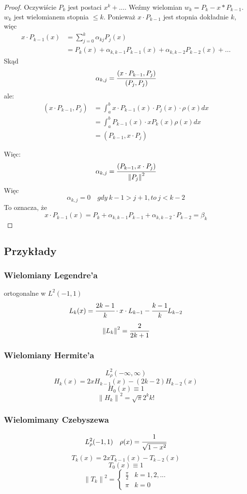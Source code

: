 \documentclass[hidelinks,a4paper,fleqn,oneside]{book}
\newcommand{\norm}[1]{\left\lVert#1\right\rVert}
\begin{document}
\begin{proof} Oczywiście $P_k$ jest postaci $x^k + ...$. Weźmy wielomian $w_k = P_k - x * P_{k-1}$. $w_k$ jest wielomianem stopnia $\leq k$. Ponieważ $x \cdot P_{k-1}$ jest stopnia dokładnie $k$, więc 
\[
	\begin{array}{cc}
	x \cdot P_{k-1}(x) & = \sum_{j=0}^k \alpha_{kj} P_j(x) \\
		& = P_k(x) + \alpha_{k, k-1} P_{k-1}(x) + \alpha_{k, k-2}P_{k-2}(x) + ...
	\end{array}
\]
Skąd
\[
	\alpha_{k, j} = \cfrac{(x \cdot P_{k-1}, P_j)}{(P_j, P_j)}
\]
ale:
\[
	\begin{array}{cc}
		(x \cdot P_{k-1}, P_j) & = \int_a^b x \cdot P_{k-1}(x) \cdot P_j(x) \cdot \rho(x) dx \\
		& = \int_a^b P_{k-1}(x) \cdot x P_k(x) \rho (x) dx  \\
		& = (P_{k-1}, x\cdot P_j)
	\end{array}
\]

Więc:
\[
	\alpha_{k, j} = \cfrac{(P_{k-1}, x \cdot P_j)}{\norm{P_j}^2}
\]
Więc
\[
	\alpha_{k, j} = 0 \quad gdy\ k-1 >j+1, to\ j < k-2
\]
To oznacza, że
\[
	x \cdot P_{k-1}(x) = P_k + \alpha_{k, k-1} P_{k-1} + \alpha_{k, k-2} \cdot P_{k-2} = \beta_k
\]

\end{proof}

\subsection{Przykłady}

\subsubsection{Wielomiany Legendre'a}

ortogonalne w $L^2(-1, 1)$
\[
	L_k(x) = \cfrac{2k-1}{k} \cdot x \cdot L_{k-1} - \cfrac{k-1}{k}L_{k-2}
\]
\[
	\norm{L_k}^2 = \cfrac{2}{2k+1}
\]

\subsubsection{Wielomiany Hermite'a}
\[
L_\rho^2(-\infty, \infty)
\]
\[
H_k(x) = 2xH_{k-1}(x) - (2k - 2)H_{k-2}(x)
\]
\[
	H_0(x) \equiv 1
\]
\[
	\norm{H_k}^2 = \sqrt{\pi} 2^k k!
\]
\subsubsection{Wielomimany Czebyszewa}
\[
	L_\rho^2(-1, 1) \quad \rho(x) = \cfrac{1}{\sqrt{1-x^2}}
\]
\[
	T_k(x) = 2xT_{k-1}(x) - T_{k-2}(x)
\]
\[
	T_0(x) \equiv 1
\]
\[
	\norm{T_k}^2 = \left\{ \begin{array}{rl} \frac{\pi}{2} & k = 1, 2, ... \\ \pi & k = 0\end{array}\right.
\]
\end{document}
